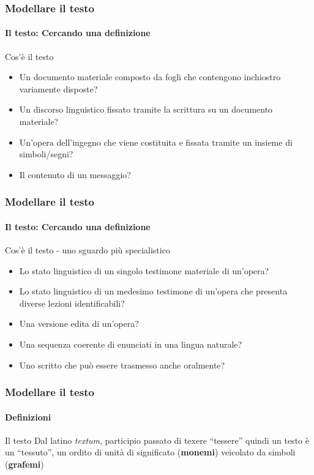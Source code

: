 \begin{frame}
	\frametitle{Modellare il testo}
	\framesubtitle{Il testo: Cercando una definizione}
	\addtocounter{nframe}{1}

	\begin{block}{Cos'è il testo}
		\begin{itemize}
			\item Un documento materiale composto da fogli che contengono inchiostro variamente disposte?
			\item Un discorso linguistico fissato tramite la scrittura su un documento materiale?
			\item Un’opera dell’ingegno che viene costituita e fissata tramite un insieme di simboli/segni?
			\item Il contenuto di un messaggio?
		\end{itemize}
	\end{block}
\end{frame}

\begin{frame}
	\frametitle{Modellare il testo}
	\framesubtitle{Il testo: Cercando una definizione}
	\addtocounter{nframe}{1}

	\begin{block}{Cos'è il testo - uno sguardo più specialistico}
		\begin{itemize}
			\item Lo stato linguistico di un singolo testimone materiale di un’opera?
			\item Lo stato linguistico di un medesimo testimone di un’opera che presenta diverse lezioni identificabili?
			\item Una versione edita di un’opera?
			\item Una sequenza coerente di enunciati in una lingua naturale?
			\item Uno scritto che può essere trasmesso anche oralmente?
		\end{itemize}
	\end{block}

\end{frame}

\begin{frame}
	\frametitle{Modellare il testo}
	\framesubtitle{Definizioni}
	\addtocounter{nframe}{1}

	\begin{block}{Il testo}
		Dal latino \textit{textum}, participio passato di texere ``tessere'' quindi un testo è un ``tessuto'', un ordito di unità di significato (\textbf{monemi}) veicolato da simboli (\textbf{grafemi})
	\end{block}

\end{frame}

